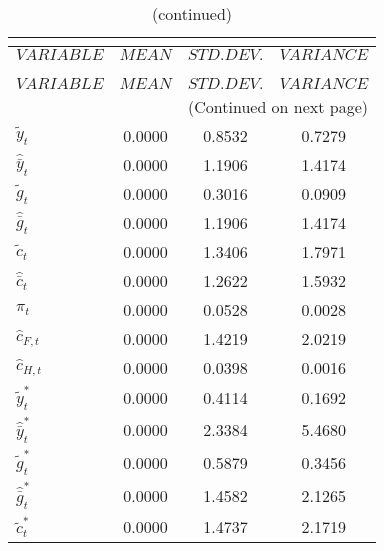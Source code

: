  
\begin{center}
\begin{longtable}{lccc} 
\caption{THEORETICAL MOMENTS}\\
 \label{Table:th_moments}\\
\toprule 
$VARIABLE             $	 & 	 $         MEAN$	 & 	 $    STD. DEV.$	 & 	 $     VARIANCE$\\
\midrule \endfirsthead 
\caption{(continued)}\\
 \toprule \\ 
$VARIABLE             $	 & 	 $         MEAN$	 & 	 $    STD. DEV.$	 & 	 $     VARIANCE$\\
\midrule \endhead 
\midrule \multicolumn{4}{r}{(Continued on next page)} \\ \bottomrule \endfoot 
\bottomrule \endlastfoot 
${\tilde y_t}         $	 & 	       0.0000	 & 	       0.8532	 & 	       0.7279 \\ 
${\hat {\bar y}_t}    $	 & 	       0.0000	 & 	       1.1906	 & 	       1.4174 \\ 
${\tilde g_t}         $	 & 	       0.0000	 & 	       0.3016	 & 	       0.0909 \\ 
${\hat {\bar g}_t}    $	 & 	       0.0000	 & 	       1.1906	 & 	       1.4174 \\ 
${\tilde c_t}         $	 & 	       0.0000	 & 	       1.3406	 & 	       1.7971 \\ 
${\hat {\bar c}_t}    $	 & 	       0.0000	 & 	       1.2622	 & 	       1.5932 \\ 
${\pi_t}              $	 & 	       0.0000	 & 	       0.0528	 & 	       0.0028 \\ 
${\hat c_{F,t}}       $	 & 	       0.0000	 & 	       1.4219	 & 	       2.0219 \\ 
${\hat c_{H,t}}       $	 & 	       0.0000	 & 	       0.0398	 & 	       0.0016 \\ 
${\tilde y_t^*}       $	 & 	       0.0000	 & 	       0.4114	 & 	       0.1692 \\ 
${\hat {\bar y}_t^*}  $	 & 	       0.0000	 & 	       2.3384	 & 	       5.4680 \\ 
${\tilde g_t^*}       $	 & 	       0.0000	 & 	       0.5879	 & 	       0.3456 \\ 
${\hat {\bar g}_t^*}  $	 & 	       0.0000	 & 	       1.4582	 & 	       2.1265 \\ 
${\tilde c_t^*}       $	 & 	       0.0000	 & 	       1.4737	 & 	       2.1719 \\ 

\end{longtable}
\end{center}

